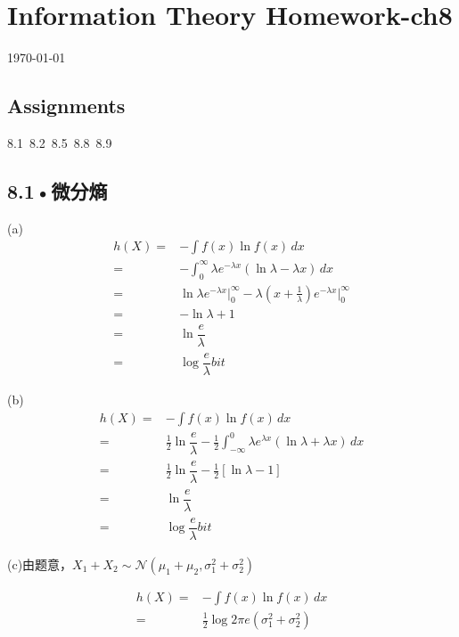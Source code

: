 \documentclass[UTF8]{ctexart}
\begin{document}
\section*{Information Theory Homework-ch8}
\begin{center}
\today
\end{center}
\subsection*{Assignments}


8.1\ 8.2\ 8.5\ 8.8\ 8.9


\subsection*{8.1•微分熵}
(a)\begin{equation*}
    \begin{split}
        h(X)=&-\int f(x)\ln f(x) \,dx \\
            =&-\int_0^\infty \lambda e^{-\lambda x}(\ln\lambda - \lambda x)\,dx \\
            =&\ln\lambda e^{-\lambda x }\vert _0^\infty-\lambda (x+\frac{1}{\lambda}) e^{-\lambda x}\vert _0^\infty\\
            =& -\ln\lambda +1 \\
            =& \ln \dfrac{e}{\lambda}\\
            =&\log \dfrac{e}{\lambda} bit
    \end{split}
\end{equation*}


(b)\begin{equation*}
    \begin{split}
        h(X)=&-\int f(x)\ln f(x) \,dx \\
            =& \frac{1}{2}\ln \dfrac{e}{\lambda} -\frac{1}{2}\int_{-\infty}^0\lambda e^{\lambda x}(\ln\lambda + \lambda x)\,dx \\
            =& \frac{1}{2}\ln \dfrac{e}{\lambda} -\frac{1}{2}[\ln\lambda -1]\\
            =& \ln \dfrac{e}{\lambda}\\
            =&\log \dfrac{e}{\lambda} bit
    \end{split}
\end{equation*}


(c)由题意，$X_1+X_2\sim \mathcal{N}(\mu_1+\mu_2, \sigma^2_1+\sigma^2_2) $

\begin{equation*}
    \begin{split}
        h(X)=&-\int f(x)\ln f(x) \,dx \\
            =&\frac{1}{2}\log 2\pi e (\sigma_1^2+\sigma_2^2)
    \end{split}
\end{equation*}
\end{document}
